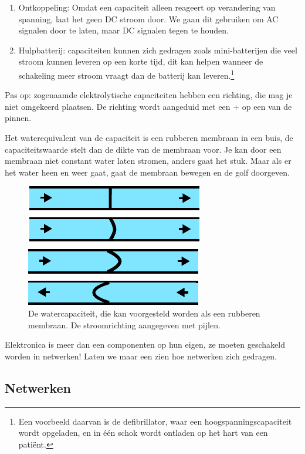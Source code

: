 \documentclass{article}
\begin{document}
		\begin{enumerate}
			\item Ontkoppeling: Omdat een capaciteit alleen reageert op verandering van spanning, laat het geen DC stroom door. We gaan dit gebruiken om AC signalen door te laten, maar DC signalen tegen te houden.
			\item Hulpbatterij: capaciteiten kunnen zich gedragen zoals mini-batterijen die veel stroom kunnen leveren op een korte tijd, dit kan helpen wanneer de schakeling meer stroom vraagt dan de batterij kan leveren.\footnote{ Een voorbeeld daarvan is de defibrillator, waar een hoogspanningscapaciteit wordt opgeladen, en in \'e\'en schok wordt ontladen op het hart van een pati\"ent.}
		\end{enumerate}
		Pas op: zogenaamde elektrolytische capaciteiten hebben een richting, die mag je niet omgekeerd plaatsen. De richting wordt aangeduid met een + op een van de pinnen.

		Het waterequivalent van de capaciteit is een rubberen membraan in een buis, de capaciteitswaarde stelt dan de dikte van de membraan voor. Je kan door een membraan niet constant water laten stromen, anders gaat het stuk. Maar als er het water heen en weer gaat, gaat de membraan bewegen en de golf doorgeven. 
		\begin{figure}[htbp]
				\centering
				\includegraphics{watercap}
				\caption{De watercapaciteit, die kan voorgesteld worden als een rubberen membraan. De stroomrichting aangegeven met pijlen.}
				\label{fig:watercap}
			\end{figure}

		Elektronica is meer dan een componenten op hun eigen, ze moeten geschakeld worden in netwerken! Laten we maar een zien hoe netwerken zich gedragen.

		\subsection{Netwerken}
\end{document}
